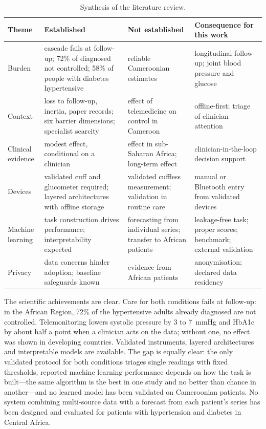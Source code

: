 \begin{table}[htbp]
\centering\footnotesize
\caption{Synthesis of the literature review.}\label{tab:lr-synthesis}
\begin{tabularx}{\textwidth}{@{}>{\raggedright\arraybackslash}p{2.1cm} >{\raggedright\arraybackslash}X >{\raggedright\arraybackslash}X >{\raggedright\arraybackslash}X@{}}
\toprule
\textbf{Theme} & \textbf{Established} & \textbf{Not established} & \textbf{Consequence for this work} \\
\midrule
Burden & cascade fails at follow-up; 72\% of diagnosed not controlled; 58\% of people with diabetes hypertensive & reliable Cameroonian estimates & longitudinal follow-up; joint blood pressure and glucose \\
Context & loss to follow-up, inertia, paper records; six barrier dimensions; specialist scarcity & effect of telemedicine on control in Cameroon & offline-first; triage of clinician attention \\
Clinical evidence & modest effect, conditional on a clinician & effect in sub-Saharan Africa; long-term effect & clinician-in-the-loop decision support \\
Devices & validated cuff and glucometer required; layered architectures with offline storage & validated cuffless measurement; validation in routine care & manual or Bluetooth entry from validated devices \\
Machine learning & task construction drives performance; interpretability expected & forecasting from individual series; transfer to African patients & leakage-free task; proper scores; benchmark; external validation \\
Privacy & data concerns hinder adoption; baseline safeguards known & evidence from African patients & anonymisation; declared data residency \\
\bottomrule
\end{tabularx}
\end{table}

The scientific achievements are clear. Care for both conditions fails at follow-up: in the African Region, 72\% of the hypertensive adults already diagnosed are not controlled. Telemonitoring lowers systolic pressure by 3 to 7~mmHg and HbA1c by about half a point when a clinician acts on the data; without one, no effect was shown in developing countries. Validated instruments, layered architectures and interpretable models are available. The gap is equally clear: the only validated protocol for both conditions triages single readings with fixed thresholds, reported machine learning performance depends on how the task is built---the same algorithm is the best in one study and no better than chance in another---and no learned model has been validated on Cameroonian patients. No system combining multi-source data with a forecast from each patient's series has been designed and evaluated for patients with hypertension and diabetes in Central Africa.

